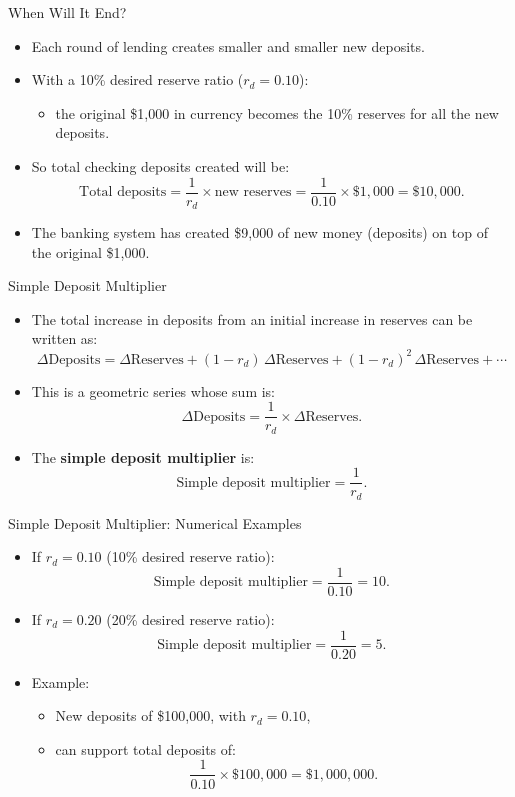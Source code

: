 \documentclass[aspectratio=169]{beamer}
\begin{document}
\begin{frame}{When Will It End?}
\transfade
\begin{itemize}
  \item Each round of lending creates smaller and smaller new deposits.
  \item With a 10\% desired reserve ratio (\(r_{d} = 0.10\)):
  \begin{itemize}
    \item the original \$1{,}000 in currency becomes the 10\% reserves for all the new deposits.
  \end{itemize}
  \item So total checking deposits created will be:
  \[
    \text{Total deposits} = \frac{1}{r_{d}} \times \text{new reserves}
    = \frac{1}{0.10} \times \$1{,}000 = \$10{,}000.
  \]
  \item The banking system has created \$9{,}000 of new money (deposits) on top of the original \$1{,}000.
\end{itemize}
\end{frame}

\begin{frame}{Simple Deposit Multiplier}
\transfade
\begin{itemize}
  \item The total increase in deposits from an initial increase in reserves can be written as:
  \[
    \Delta \text{Deposits} =
      \Delta \text{Reserves}
      + (1 - r_{d})\,\Delta \text{Reserves}
      + (1 - r_{d})^{2}\,\Delta \text{Reserves}
      + \cdots
  \]
  \item This is a geometric series whose sum is:
  \[
    \Delta \text{Deposits}
      = \frac{1}{r_{d}} \times \Delta \text{Reserves}.
  \]
  \item The \textbf{simple deposit multiplier} is:
  \[
    \text{Simple deposit multiplier} = \frac{1}{r_{d}}.
  \]
\end{itemize}
\end{frame}

\begin{frame}{Simple Deposit Multiplier: Numerical Examples}
\transfade
\begin{itemize}
  \item If \(r_{d} = 0.10\) (10\% desired reserve ratio):
  \[
    \text{Simple deposit multiplier} = \frac{1}{0.10} = 10.
  \]
  \item If \(r_{d} = 0.20\) (20\% desired reserve ratio):
  \[
    \text{Simple deposit multiplier} = \frac{1}{0.20} = 5.
  \]
  \item Example:
  \begin{itemize}
    \item New deposits of \$100{,}000, with \(r_{d} = 0.10\),
    \item can support total deposits of:
    \[
      \frac{1}{0.10} \times \$100{,}000 = \$1{,}000{,}000.
    \]
  \end{itemize}
\end{itemize}
\end{frame}
\end{document}
